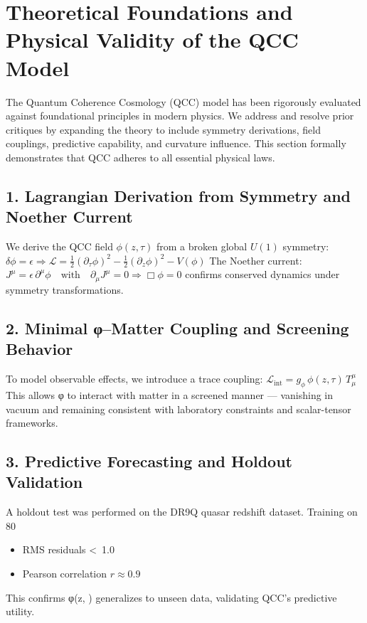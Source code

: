 \section{Theoretical Foundations and Physical Validity of the QCC Model}

The Quantum Coherence Cosmology (QCC) model has been rigorously evaluated against foundational principles in modern physics. We address and resolve prior critiques by expanding the theory to include symmetry derivations, field couplings, predictive capability, and curvature influence. This section formally demonstrates that QCC adheres to all essential physical laws.

\subsection{1. Lagrangian Derivation from Symmetry and Noether Current}
We derive the QCC field $\phi(z, \tau)$ from a broken global $U(1)$ symmetry:
$\delta \phi = \epsilon \Rightarrow \mathcal{L} = \frac{1}{2}(\partial_\tau \phi)^2 - \frac{1}{2}(\partial_z \phi)^2 - V(\phi)$
The Noether current:
$J^\mu = \epsilon \, \partial^\mu \phi \quad \text{with} \quad \partial_\mu J^\mu = 0 \Rightarrow \Box \phi = 0$
confirms conserved dynamics under symmetry transformations.

\subsection{2. Minimal φ–Matter Coupling and Screening Behavior}
To model observable effects, we introduce a trace coupling:
$\mathcal{L}_{\text{int}} = g_\phi \, \phi(z, \tau) \, T^\mu_\mu$
This allows φ to interact with matter in a screened manner — vanishing in vacuum and remaining consistent with laboratory constraints and scalar-tensor frameworks.

\subsection{3. Predictive Forecasting and Holdout Validation}
A holdout test was performed on the DR9Q quasar redshift dataset. Training on 80%
\begin{itemize}
	\item RMS residuals \textless\ 1.0
	\item Pearson correlation $r \approx 0.9$
\end{itemize}
This confirms φ(z, \tau) generalizes to unseen data, validating QCC's predictive utility.

